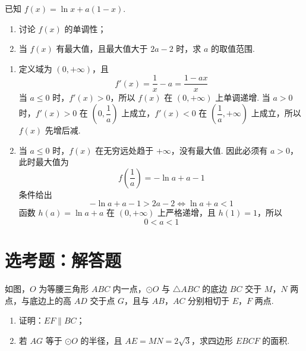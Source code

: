 \begin{problem}
已知 \(f(x) = \ln x + a(1 - x)\).
\begin{enumerate}
\item 讨论 \(f(x)\) 的单调性；
\item 当 \(f(x)\) 有最大值，且最大值大于 \(2a - 2\) 时，求 \(a\) 的取值范围.
\end{enumerate}
\end{problem}

\begin{solution}
\begin{enumerate}
\item 定义域为 \((0,+\infty)\)，且
\[
f'(x)=\frac1x-a=\frac{1-ax}{x}
\]
当 \(a\leqslant0\) 时，\(f'(x)>0\)，所以 \(f(x)\) 在 \((0,+\infty)\) 上单调递增. 当 \(a>0\) 时，\(f'(x)>0\) 在 \(\left(0,\dfrac1a\right)\) 上成立，\(f'(x)<0\) 在 \(\left(\dfrac1a,+\infty\right)\) 上成立，所以 \(f(x)\) 先增后减.

\item 当 \(a\leqslant0\) 时，\(f(x)\) 在无穷远处趋于 \(+\infty\)，没有最大值. 因此必须有 \(a>0\)，此时最大值为
\[
f\left(\frac1a\right)=-\ln a+a-1
\]
条件给出
\[
-\ln a+a-1>2a-2\Longleftrightarrow \ln a+a<1
\]
函数 \(h(a)=\ln a+a\) 在 \((0,+\infty)\) 上严格递增，且 \(h(1)=1\)，所以
\[
0<a<1
\]
\end{enumerate}
\end{solution}

\section{选考题：解答题}

\begin{problem}
如图，\(O\) 为等腰三角形 \(ABC\) 内一点，\(\odot O\) 与 \(\triangle ABC\) 的底边 \(BC\) 交于 \(M\)，\(N\) 两点，与底边上的高 \(AD\) 交于点 \(G\)，且与 \(AB\)，\(AC\) 分别相切于 \(E\)，\(F\) 两点.

\begin{enumerate}
\item 证明：\(EF \parallel BC\)；
\item 若 \(AG\) 等于 \(\odot O\) 的半径，且 \(AE = MN = 2\sqrt{3}\)，求四边形 \(EBCF\) 的面积.
\end{enumerate}

\end{problem}

